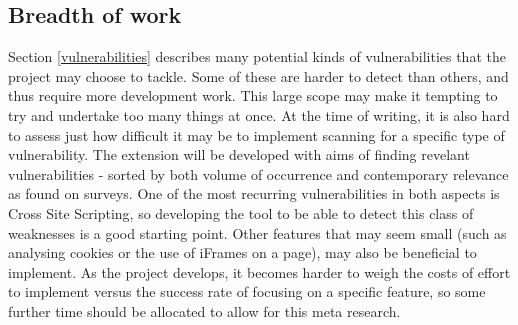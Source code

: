 \subsection{Breadth of  work}
Section \ref{vulnerabilities} describes many potential kinds of vulnerabilities that the project may choose to tackle. Some of these are harder to detect than others, and thus require more development work. This large scope may make it tempting to try and undertake too many things at once. At the time of writing, it is also hard to assess just how difficult it may be to implement scanning for a specific type of vulnerability. The extension will be developed with aims of finding revelant vulnerabilities - sorted by both volume of occurrence and contemporary relevance as found on surveys. One of the most recurring vulnerabilities in both aspects is Cross Site Scripting, so developing the tool to be able to detect this class of weaknesses is a good starting point. Other features that may seem small (such as analysing cookies or the use of iFrames on a page), may also be beneficial to implement. As the project develops, it becomes harder to weigh the costs of effort to implement versus the success rate of focusing on a specific feature, so some further time should be allocated to allow for this meta research. \\ 

